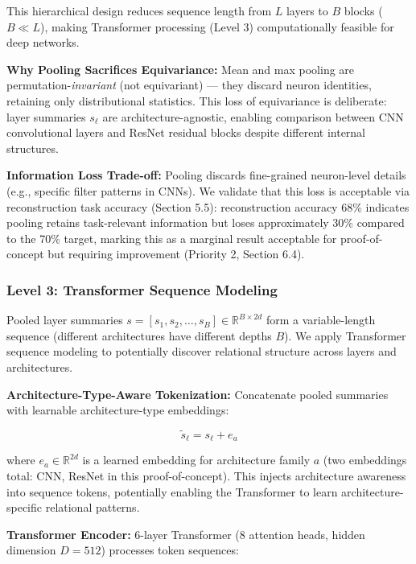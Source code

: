 This hierarchical design reduces sequence length from $L$ layers to $B$ blocks ($B \ll L$), making Transformer processing (Level 3) computationally feasible for deep networks.

\textbf{Why Pooling Sacrifices Equivariance:} Mean and max pooling are permutation-\textit{invariant} (not equivariant) --- they discard neuron identities, retaining only distributional statistics. This loss of equivariance is deliberate: layer summaries $s_\ell$ are architecture-agnostic, enabling comparison between CNN convolutional layers and ResNet residual blocks despite different internal structures.

\textbf{Information Loss Trade-off:} Pooling discards fine-grained neuron-level details (e.g., specific filter patterns in CNNs). We validate that this loss is acceptable via reconstruction task accuracy (Section 5.5): reconstruction accuracy 68\% indicates pooling retains task-relevant information but loses approximately 30\% compared to the 70\% target, marking this as a marginal result acceptable for proof-of-concept but requiring improvement (Priority 2, Section 6.4).

\subsubsection{Level 3: Transformer Sequence Modeling}

Pooled layer summaries $s = [s_1, s_2, \ldots, s_B] \in \mathbb{R}^{B \times 2d}$ form a variable-length sequence (different architectures have different depths $B$). We apply Transformer sequence modeling to potentially discover relational structure across layers and architectures.

\textbf{Architecture-Type-Aware Tokenization:} Concatenate pooled summaries with learnable architecture-type embeddings:

\begin{equation}
\tilde{s}_\ell = s_\ell + e_a
\end{equation}

where $e_a \in \mathbb{R}^{2d}$ is a learned embedding for architecture family $a$ (two embeddings total: CNN, ResNet in this proof-of-concept). This injects architecture awareness into sequence tokens, potentially enabling the Transformer to learn architecture-specific relational patterns.

\textbf{Transformer Encoder:} 6-layer Transformer (8 attention heads, hidden dimension $D=512$) processes token sequences:

